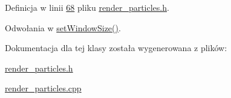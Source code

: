 Definicja w linii \hyperlink{render__particles_8h_source_l00068}{68} pliku \hyperlink{render__particles_8h_source}{render\-\_\-particles.\-h}.



Odwołania w \hyperlink{render__particles_8h_source_l00050}{set\-Window\-Size()}.



Dokumentacja dla tej klasy została wygenerowana z plików\-:\begin{DoxyCompactItemize}
\item 
\hyperlink{render__particles_8h}{render\-\_\-particles.\-h}\item 
\hyperlink{render__particles_8cpp}{render\-\_\-particles.\-cpp}\end{DoxyCompactItemize}
